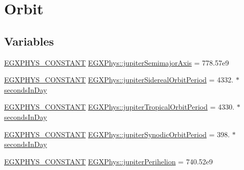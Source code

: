 \hypertarget{group___e_g_x_phys-_constants-_astrophysics-_solar_system-_jupiter-_orbit}{}\section{Orbit}
\label{group___e_g_x_phys-_constants-_astrophysics-_solar_system-_jupiter-_orbit}
\subsection*{Variables}
\begin{DoxyCompactItemize}
\item 
\mbox{\hyperlink{group___e_g_x_phys-_constants-_macros_ga76980d288494ce1714c9ac68a95ba702}{E\+G\+X\+P\+H\+Y\+S\+\_\+\+C\+O\+N\+S\+T\+A\+NT}} \mbox{\hyperlink{group___e_g_x_phys-_constants-_astrophysics-_solar_system-_jupiter-_orbit_ga7cfafd3fa5a3ac5018c0be84dbb6600c}{E\+G\+X\+Phys\+::jupiter\+Semimajor\+Axis}} = 778.\+57e9
\item 
\mbox{\hyperlink{group___e_g_x_phys-_constants-_macros_ga76980d288494ce1714c9ac68a95ba702}{E\+G\+X\+P\+H\+Y\+S\+\_\+\+C\+O\+N\+S\+T\+A\+NT}} \mbox{\hyperlink{group___e_g_x_phys-_constants-_astrophysics-_solar_system-_jupiter-_orbit_ga96e12fb8636fcff0c503d7765bc1e192}{E\+G\+X\+Phys\+::jupiter\+Sidereal\+Orbit\+Period}} = 4332. $\ast$ \mbox{\hyperlink{namespace_e_g_x_phys_a93d2a00d75411b58cbf63ab3fd1f8bc2}{seconds\+In\+Day}}
\item 
\mbox{\hyperlink{group___e_g_x_phys-_constants-_macros_ga76980d288494ce1714c9ac68a95ba702}{E\+G\+X\+P\+H\+Y\+S\+\_\+\+C\+O\+N\+S\+T\+A\+NT}} \mbox{\hyperlink{group___e_g_x_phys-_constants-_astrophysics-_solar_system-_jupiter-_orbit_gadfa22f4534517958f4a3d8b13b83eb6f}{E\+G\+X\+Phys\+::jupiter\+Tropical\+Orbit\+Period}} = 4330. $\ast$ \mbox{\hyperlink{namespace_e_g_x_phys_a93d2a00d75411b58cbf63ab3fd1f8bc2}{seconds\+In\+Day}}
\item 
\mbox{\hyperlink{group___e_g_x_phys-_constants-_macros_ga76980d288494ce1714c9ac68a95ba702}{E\+G\+X\+P\+H\+Y\+S\+\_\+\+C\+O\+N\+S\+T\+A\+NT}} \mbox{\hyperlink{group___e_g_x_phys-_constants-_astrophysics-_solar_system-_jupiter-_orbit_gaa7c9f21fa2b8062166764a6f59d0bbeb}{E\+G\+X\+Phys\+::jupiter\+Synodic\+Orbit\+Period}} = 398. $\ast$ \mbox{\hyperlink{namespace_e_g_x_phys_a93d2a00d75411b58cbf63ab3fd1f8bc2}{seconds\+In\+Day}}
\item 
\mbox{\hyperlink{group___e_g_x_phys-_constants-_macros_ga76980d288494ce1714c9ac68a95ba702}{E\+G\+X\+P\+H\+Y\+S\+\_\+\+C\+O\+N\+S\+T\+A\+NT}} \mbox{\hyperlink{group___e_g_x_phys-_constants-_astrophysics-_solar_system-_jupiter-_orbit_ga7eb6c0d478ae5c7ad6ae94bfcb9c47d9}{E\+G\+X\+Phys\+::jupiter\+Perihelion}} = 740.\+52e9

\end{DoxyCompactItemize}
